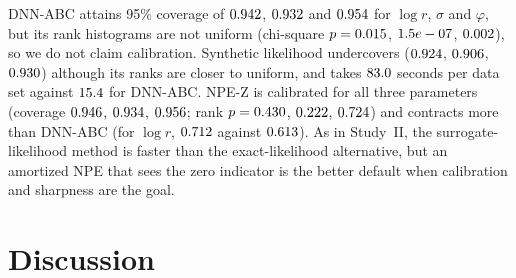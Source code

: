 \documentclass[sn-basic,iicol,pdflatex]{sn-jnl}
\begin{document}
DNN-ABC attains 95\% coverage of $0.942$, $0.932$ and $0.954$ for $\log r$, $\sigma$ and $\varphi$, but its rank histograms are
not uniform (chi-square $p=0.015$, $1.5e-07$, $0.002$), so we do not claim calibration. Synthetic likelihood undercovers
($0.924$, $0.906$, $0.930$) although its ranks are closer to uniform, and takes $83.0$ seconds per data set against
$15.4$ for DNN-ABC. NPE-Z is calibrated for all three parameters (coverage $0.946$, $0.934$, $0.956$; rank
$p=0.430$, $0.222$, $0.724$) and contracts more than DNN-ABC (for $\log r$, $0.712$ against $0.613$). As in Study~II,
the surrogate-likelihood method is faster than the exact-likelihood alternative, but an amortized NPE that sees the zero indicator is the better default when calibration and sharpness are the goal.

\section{Discussion}
\label{sec:discussion}
\end{document}
